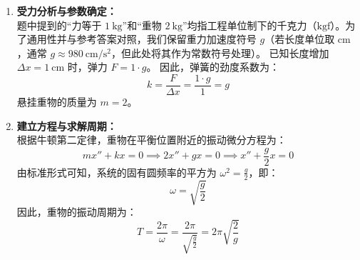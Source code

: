 \documentclass[lang=cn,11pt]{elegantbook}
\begin{document}
\begin{solution}
\begin{enumerate}
    \item \textbf{受力分析与参数确定：}\\
    题中提到的“力等于 $1\ \mathrm{kg}$”和“重物 $2\ \mathrm{kg}$”均指工程单位制下的千克力（$\mathrm{kgf}$）。为了通用性并与参考答案对照，我们保留重力加速度符号 $g$（若长度单位取 $\mathrm{cm}$，通常 $g \approx 980\ \mathrm{cm/s^2}$，但此处将其作为常数符号处理）。
    已知长度增加 $\Delta x = 1\ \mathrm{cm}$ 时，弹力 $F = 1 \cdot g$。
    因此，弹簧的劲度系数为：
    \[
    k = \frac{F}{\Delta x} = \frac{1 \cdot g}{1} = g
    \]
    悬挂重物的质量为 $m = 2$。

    \item \textbf{建立方程与求解周期：}\\
    根据牛顿第二定律，重物在平衡位置附近的振动微分方程为：
    \[
    m x'' + k x = 0 \implies 2x'' + gx = 0 \implies x'' + \frac{g}{2}x = 0
    \]
    由标准形式可知，系统的固有圆频率的平方为 $\omega^2 = \frac{g}{2}$，即：
    \[
    \omega = \sqrt{\frac{g}{2}}
    \]
    因此，重物的振动周期为：
    \[
    \boxed{T = \frac{2\pi}{\omega} = \frac{2\pi}{\sqrt{\frac{g}{2}}} = 2\pi\sqrt{\frac{2}{g}}}
    \]
\end{enumerate}
\end{solution}
\end{document}
